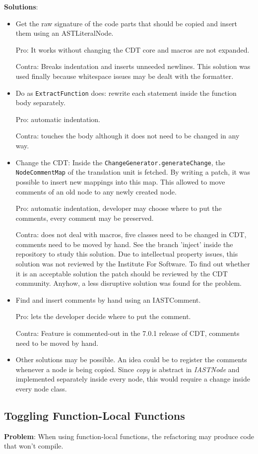 \textbf{Solutions}:
\begin{itemize}
\item Get the raw signature of the code parts that should be copied and insert 
them using an ASTLiteralNode. 

Pro: It works without changing the CDT core and macros are not expanded. 

Contra: Breaks indentation and inserts unneeded newlines. This solution was used 
finally because whitespace issues may be dealt with the formatter.
\item Do as \texttt{ExtractFunction} does: rewrite each statement inside the 
function body separately. 

Pro: automatic indentation. 

Contra: touches the body although it does not need to be changed in any way. 
\item Change the CDT: Inside the \texttt{ChangeGenerator.generateChange}, the 
\texttt{NodeCommentMap} of the translation unit is fetched. By writing a patch, 
it was possible to insert new mappings into this map. This allowed to move 
comments of an old node to any newly created node. 

Pro: automatic indentation, developer may choose where to put the comments, 
every comment may be preserved. 

Contra: does not deal with macros, five classes need to be changed in CDT, 
comments need to be moved by hand. See the branch 'inject' inside the repository 
to study this solution. Due to intellectual property issues, this solution was 
not reviewed by the Institute For Software. To find out whether it is an 
acceptable solution the patch should be reviewed by the CDT community. Anyhow, a 
less disruptive solution was found for the problem.
\item Find and insert comments by hand using an IASTComment. 

Pro: lets the developer decide where to put the comment. 

Contra: Feature is commented-out in the 7.0.1 release of CDT, comments need to 
be moved by hand.
\item Other solutions may be possible. An idea could be to register the comments 
whenever a node is being copied. Since \textit{copy} is abstract in 
\textit{IASTNode} and implemented separately inside every node, this would 
require a change inside every node class.
\end{itemize}

\subsection{Toggling Function-Local Functions}
\textbf{Problem}: When using function-local functions, the refactoring may 
produce code that won't compile.

